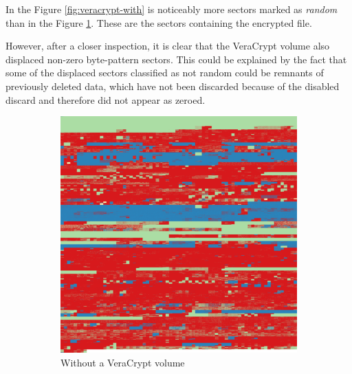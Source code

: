 \documentclass[
  digital, %
  color,   %
  oneside, %
  lof,     %
  nolot,     %
]{fithesis4}
\begin{document}
In the Figure \ref{fig:veracrypt-with} is noticeably more sectors marked as \emph{random} than in the Figure \ref{fig:veracrypt-without}.
These are the sectors containing the encrypted file. 

However, after a closer inspection, it is clear that the VeraCrypt volume also displaced non-zero byte-pattern sectors.
This could be explained by the fact that some of the displaced sectors classified as not random could be remnants of previously deleted data, which have not been discarded because of the disabled discard and therefore did not appear as zeroed.

\begin{figure}
  \centering
  \begin{subfigure}[t]{.45\textwidth}
    \centering
    \includegraphics[width=\textwidth,interpolate=false]{ubnt-unencrypted-chi2-4-sweeping-blocks.png}
    \caption{Without a VeraCrypt volume}
    \label{fig:veracrypt-without}
  \end{subfigure}
  \hfill
  \begin{subfigure}[t]{.45\textwidth}
    \centering

\end{subfigure}
\end{figure}
\end{document}
